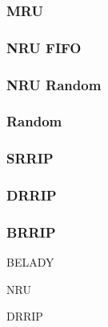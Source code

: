 \subsubsection{MRU}
\subsubsection{NRU FIFO}
\subsubsection{NRU Random}
\subsubsection{Random}
\subsubsection{SRRIP}
\subsubsection{DRRIP}
\subsubsection{BRRIP}


\label{sec:policies}
BELADY

NRU

DRRIP
